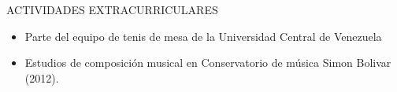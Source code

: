 \documentclass{resume} %
\begin{document}

\begin{rSection}{ACTIVIDADES EXTRACURRICULARES} %

    \begin{itemize}
        \item Parte del equipo de tenis de mesa de la Universidad Central de Venezuela
        \item Estudios de composición musical en Conservatorio de música Simon Bolivar (2012).
    \end{itemize}

\end{rSection}
\end{document}
